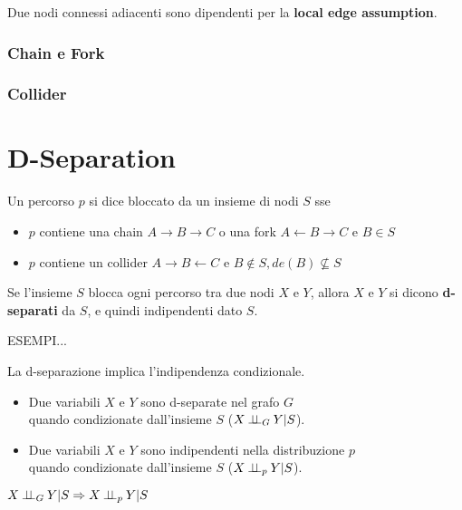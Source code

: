 Due nodi connessi adiacenti sono dipendenti per la \textbf{local edge assumption}.

\subsubsection*{Chain e Fork}


\subsubsection*{Collider}


\section{D-Separation}
Un percorso $p$ si dice bloccato da un insieme di nodi $S$ sse
\begin{itemize}
  \item $p$ contiene una chain $A \rightarrow B \rightarrow C$ o una fork $A \leftarrow B \rightarrow C$ e $B \in S$
  \item $p$ contiene un collider $A \rightarrow B \leftarrow C$ e $B \notin S, de(B) \nsubseteq S$
\end{itemize}
Se l'insieme $S$ blocca ogni percorso tra due nodi $X$ e $Y$, allora $X$ e $Y$ si dicono \textbf{d-separati} da $S$,
e quindi indipendenti dato $S$.

ESEMPI...

La d-separazione implica l'indipendenza condizionale.

\begin{itemize}
  \item Due variabili $X$ e $Y$ sono d-separate nel grafo $G$ \\quando condizionate dall'insieme $S$ ($X \ind_G Y | S$).
  \item Due variabili $X$ e $Y$ sono indipendenti nella distribuzione $p$ \\quando condizionate dall'insieme $S$ ($X \ind_p Y | S$).
\end{itemize}

$X \ind_G Y | S \Rightarrow X \ind_p Y | S$
